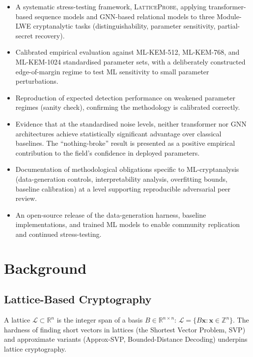 \documentclass[sigconf,nonacm]{acmart}
\begin{document}
\begin{itemize}
  \item A systematic stress-testing framework, \textsc{LatticeProbe},
        applying transformer-based sequence models and GNN-based
        relational models to three Module-LWE cryptanalytic tasks
        (distinguishability, parameter sensitivity, partial-secret
        recovery).
  \item Calibrated empirical evaluation against ML-KEM-512, ML-KEM-768,
        and ML-KEM-1024 standardised parameter sets, with a
        deliberately constructed edge-of-margin regime to test ML
        sensitivity to small parameter perturbations.
  \item Reproduction of expected detection performance on weakened
        parameter regimes (sanity check), confirming the methodology
        is calibrated correctly.
  \item Evidence that at the standardised noise levels, neither
        transformer nor GNN architectures achieve statistically
        significant advantage over classical baselines. The
        ``nothing-broke'' result is presented as a positive
        empirical contribution to the field's confidence in deployed
        parameters.
  \item Documentation of methodological obligations specific to
        ML-cryptanalysis (data-generation controls, interpretability
        analysis, overfitting bounds, baseline calibration) at a
        level supporting reproducible adversarial peer review.
  \item An open-source release of the data-generation harness,
        baseline implementations, and trained ML models to enable
        community replication and continued stress-testing.
\end{itemize}

\section{Background}

\subsection{Lattice-Based Cryptography}

A lattice $\mathcal{L} \subset \mathbb{R}^n$ is the integer span of a
basis $B \in \mathbb{R}^{n \times n}$:
$\mathcal{L} = \{B\mathbf{x} : \mathbf{x} \in \mathbb{Z}^n\}$.
The hardness of finding short vectors in lattices (the Shortest
Vector Problem, SVP) and approximate variants (Approx-SVP,
Bounded-Distance Decoding) underpins lattice cryptography.
\end{document}

